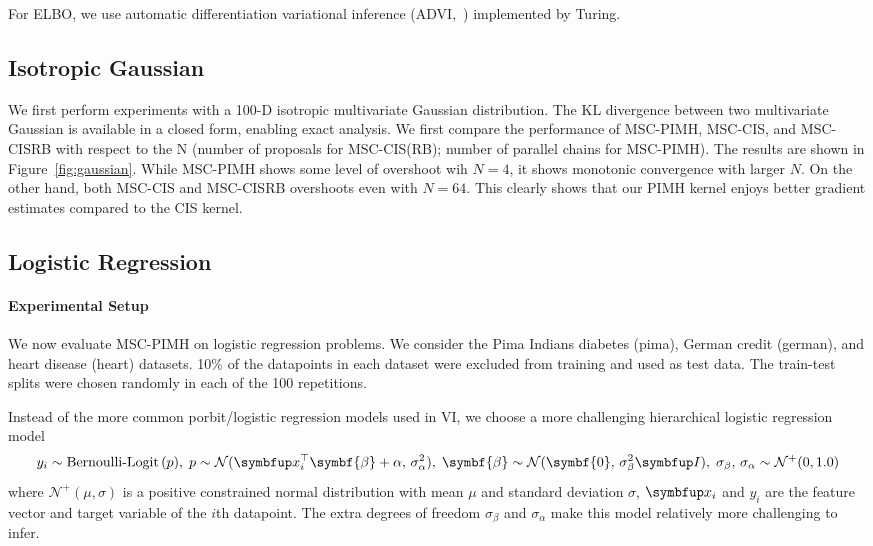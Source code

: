 For ELBO, we use automatic differentiation variational inference (ADVI,~\citealt{JMLR:v18:16-107}) implemented by Turing.

\subsection{Isotropic Gaussian}
We first perform experiments with a 100-D isotropic multivariate Gaussian distribution.
The KL divergence between two multivariate Gaussian is available in a closed form, enabling exact analysis.
We first compare the performance of MSC-PIMH, MSC-CIS, and MSC-CISRB with respect to the N (number of proposals for MSC-CIS(RB); number of parallel chains for MSC-PIMH).
The results are shown in Figure~\ref{fig:gaussian}.
While MSC-PIMH shows some level of overshoot wih \(N=4\), it shows monotonic convergence with larger \(N\).
On the other hand, both MSC-CIS and MSC-CISRB overshoots even with \(N=64\).
This clearly shows that our PIMH kernel enjoys better gradient estimates compared to the CIS kernel.

\subsection{Logistic Regression}
\paragraph{Experimental Setup}
We now evaluate MSC-PIMH on logistic regression problems.
We consider the Pima Indians diabetes (pima), German credit (german), and heart disease (heart) datasets.
10\% of the datapoints in each dataset were excluded from training and used as test data.
The train-test splits were chosen randomly in each of the 100 repetitions.

Instead of the more common porbit/logistic regression models used in VI, we choose a more challenging hierarchical logistic regression model \\
\begin{equation}
y_i \sim \text{Bernoulli-Logit}\,(p),\;
p \sim \mathcal{N}(\vx_i^{\top}\symbf{\beta} + \alpha,\, \sigma_{\alpha}^2),\;
\symbf{\beta} \sim \mathcal{N}(\symbf{0},\, \sigma_{\beta}^2 \mI),\;
\sigma_{\beta},\,\sigma_{\alpha} \sim \mathcal{N}^{+}(0, 1.0)
\end{equation}
where \(\mathcal{N}^+(\mu, \sigma)\) is a positive constrained normal distribution with mean \(\mu\) and standard deviation \(\sigma\), \(\vx_i\) and \(y_i\) are the feature vector and target variable of the \(i\)th datapoint.
The extra degrees of freedom \(\sigma_{\beta}\) and \(\sigma_{\alpha}\) make this model relatively more challenging to infer.

